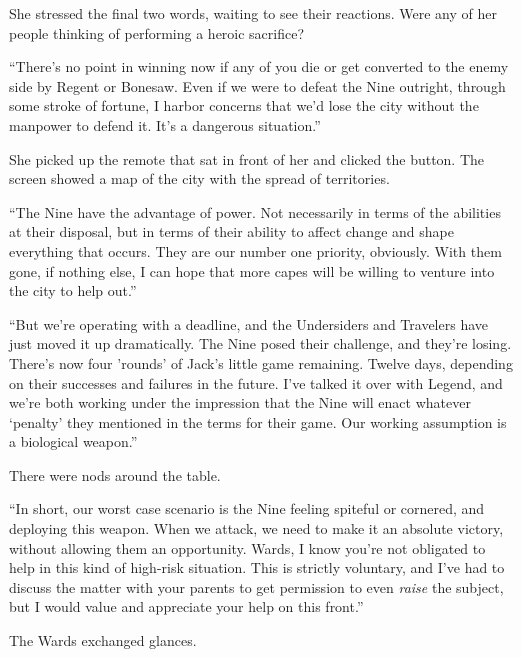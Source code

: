 She stressed the final two words, waiting to see their reactions.  Were any of her people thinking of performing a heroic sacrifice?



``There's no point in winning now if any of you die or get converted to the enemy side by Regent or Bonesaw.  Even if we were to defeat the Nine outright, through some stroke of fortune, I harbor concerns that we'd lose the city without the manpower to defend it.  It's a dangerous situation.''



She picked up the remote that sat in front of her and clicked the button.  The screen showed a map of the city with the spread of territories.



``The Nine have the advantage of power.  Not necessarily in terms of the abilities at their disposal, but in terms of their ability to affect change and shape everything that occurs.  They are our number one priority, obviously.  With them gone, if nothing else, I can hope that more capes will be willing to venture into the city to help out.''



``But we're operating with a deadline, and the Undersiders and Travelers have just moved it up dramatically.  The Nine posed their challenge, and they're losing.  There's now four 'rounds' of Jack's little game remaining.  Twelve days, depending on their successes and failures in the future.  I've talked it over with Legend, and we're both working under the impression that the Nine will enact whatever `penalty' they mentioned in the terms for their game.  Our working assumption is a biological weapon.''



There were nods around the table.



``In short, our worst case scenario is the Nine feeling spiteful or cornered, and deploying this weapon.  When we attack, we need to make it an absolute victory, without allowing them an opportunity.  Wards, I know you're not obligated to help in this kind of high-risk situation.  This is strictly voluntary, and I've had to discuss the matter with your parents to get permission to even \emph{raise} the subject, but I would value and appreciate your help on this front.''



The Wards exchanged glances.



